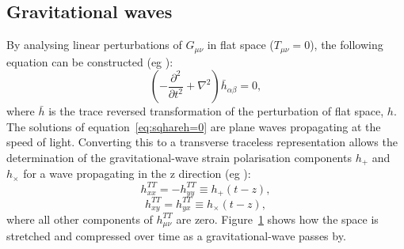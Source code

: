 \subsection{Gravitational waves}
\label{sec:GravitationalWaves}
By analysing linear perturbations of $G_{\mu\nu}$ in flat space ($T_{\mu\nu}=0$), the following equation can be constructed (eg \cite{Flanagan2005}):
\begin{equation}
\left(-\dfrac{\partial^2}{\partial t^2} + \nabla^2\right)\bar{h}_{\alpha\beta} = 0,
\label{eq:sqhareh=0}
\end{equation} 
where $\bar{h}$ is the trace reversed transformation of the  perturbation of flat space, $h$. The solutions of equation~\ref{eq:sqhareh=0} are plane waves propagating at the speed of light. Converting this to a transverse traceless representation allows the determination of the gravitational-wave strain polarisation components $h_{+}$ and $h_\times$ for a wave propagating in the z direction (eg \cite{Flanagan2005}):
\begin{equation}
h^{TT}_{xx} = -h^{TT}_{yy} \equiv h_+\left(t-z\right),
\label{eq:hplus}
\end{equation} 
\begin{equation}
h^{TT}_{xy}=h^{TT}_{yx} \equiv h_\times\left(t-z\right),
\label{eq:hcross}
\end{equation} 
where all other components of $h^{TT}_{\mu\nu}$ are zero.
Figure~\ref{fig:hpolarisation} shows how the space is stretched and compressed over time as a gravitational-wave passes by. 
\begin{figure}[H]
	\begin{center}
		\caption{\protect}
		\label{fig:hpolarisation}
	\end{center}
\end{figure}
